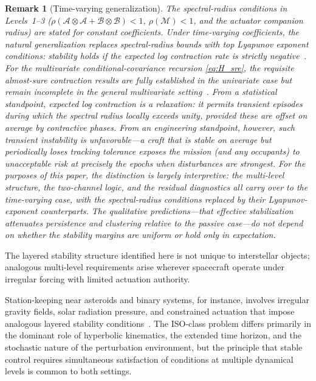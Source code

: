 \documentclass{article}
\newtheorem{remark}{Remark}
\begin{document}
\begin{remark}[Time-varying generalization]
\label{rem:time_varying}
The spectral-radius conditions in Levels~1--3 ($\rho(\mathcal{A}\otimes\mathcal{A}+\mathcal{B}\otimes\mathcal{B})<1$, $\rho(\mathcal{M})<1$, and the actuator companion radius) are stated for constant coefficients. Under time-varying coefficients, the natural generalization replaces spectral-radius bounds with top Lyapunov exponent conditions: stability holds if the expected log contraction rate is strictly negative~\cite{bougerol1992strict}. For the multivariate conditional-covariance recursion \eqref{eq:H_sre}, the requisite almost-sure contraction results are fully established in the univariate case but remain incomplete in the general multivariate setting~\cite{straumann2006quasi, andree2020dynamic}. From a statistical standpoint, expected log contraction is a relaxation: it permits transient episodes during which the spectral radius locally exceeds unity, provided these are offset on average by contractive phases. From an engineering standpoint, however, such transient instability is unfavorable---a craft that is stable on average but periodically loses tracking tolerance exposes the mission (and any occupants) to unacceptable risk at precisely the epochs when disturbances are strongest. For the purposes of this paper, the distinction is largely interpretive: the multi-level structure, the two-channel logic, and the residual diagnostics all carry over to the time-varying case, with the spectral-radius conditions replaced by their Lyapunov-exponent counterparts. The qualitative predictions---that effective stabilization attenuates persistence and clustering relative to the passive case---do not depend on whether the stability margins are uniform or hold only in expectation.
\end{remark}

The layered stability structure identified here is not unique to interstellar objects; analogous multi-level requirements arise wherever spacecraft operate under irregular forcing with limited actuation authority.

Station-keeping near asteroids and binary systems, for instance, involves irregular gravity fields, solar radiation pressure, and constrained actuation that impose analogous layered stability conditions~\cite{woo2016control_binary,shi2020stationkeeping_binary}. The ISO-class problem differs primarily in the dominant role of hyperbolic kinematics, the extended time horizon, and the stochastic nature of the perturbation environment, but the principle that stable control requires simultaneous satisfaction of conditions at multiple dynamical levels is common to both settings.
\end{document}
